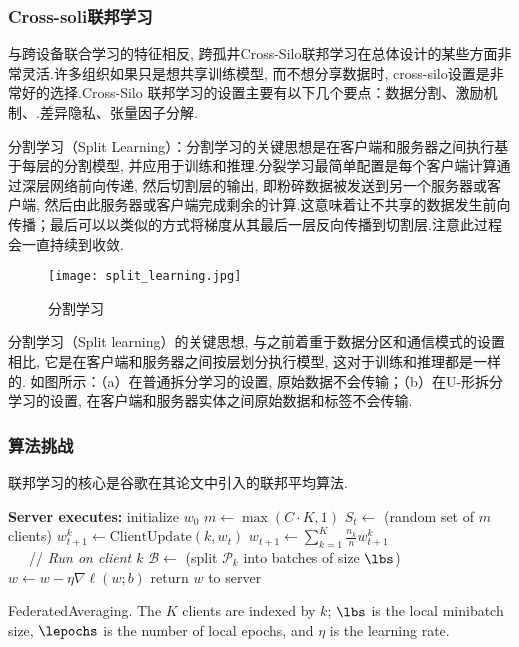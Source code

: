 \subsubsection{Cross-soli联邦学习} 
与跨设备联合学习的特征相反,  跨孤井Cross-Silo联邦学习在总体设计的某些方面非常灵活.许多组织如果只是想共享训练模型, 而不想分享数据时, cross-silo设置是非常好的选择.Cross-Silo 联邦学习的设置主要有以下几个要点：数据分割、激励机制、.差异隐私、张量因子分解.


分割学习（Split Learning）：分割学习的关键思想是在客户端和服务器之间执行基于每层的分割模型, 并应用于训练和推理.分裂学习最简单配置是每个客户端计算通过深层网络前向传递, 然后切割层的输出, 即粉碎数据被发送到另一个服务器或客户端, 然后由此服务器或客户端完成剩余的计算.这意味着让不共享的数据发生前向传播；最后可以以类似的方式将梯度从其最后一层反向传播到切割层.注意此过程会一直持续到收敛.
\begin{figure}[ht]
    \centering    
    \texttt{[image: split\_learning.jpg]}
    \caption{分割学习}
\end{figure}


分割学习（Split learning）的关键思想, 与之前着重于数据分区和通信模式的设置相比, 它是在客户端和服务器之间按层划分执行模型, 这对于训练和推理都是一样的.
如图所示：（a）在普通拆分学习的设置, 原始数据不会传输；（b）在U-形拆分学习的设置, 在客户端和服务器实体之间原始数据和标签不会传输.



\subsubsection{算法挑战}



联邦学习的核心是谷歌在其论文\cite{mcmahan2016communication}中引入的联邦平均算法\cite{alg:fedavg}. 
 

   \begin{algorithm}[t]
    \begin{algorithmic}
    \State \textbf{Server executes:}
       \State initialize $w_0$
       \hspace{1em} \State $m \leftarrow \max( C\cdot K,  1)$
          \State $S_t \leftarrow$ (random set of $m$ clients)
            \State $w_{t+1}^k \leftarrow \text{ClientUpdate}(k,  w_t)$ 
           \State $w_{t+1} \leftarrow \sum_{k=1}^K \frac{n_k}{n} w_{t+1}^k$ \\

     \ \ \  // \emph{Run on client $k$}
      \State $\mathcal{B} \leftarrow$ (split $\mathcal{P}_k$ into batches of size $\lbs$)
         \State $w \leftarrow w - \eta \nabla \ell(w; b)$
       \State return $w$ to server
    \end{algorithmic}
    \caption{FederatedAveraging. The $K$
      clients are indexed by $k$; $\lbs$ is the local minibatch size, 
      $\lepochs$ is the number of local epochs,  and $\eta$ is the learning
      rate.} 
    \label{alg:fedavg}
    \end{algorithm}
     
